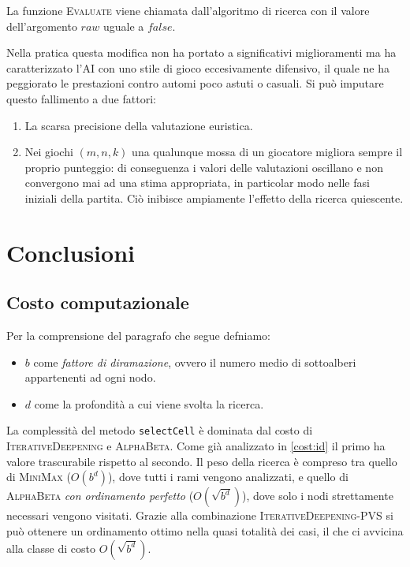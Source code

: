 \documentclass{article}
\begin{document}
La funzione \textsc{Evaluate} viene chiamata dall'algoritmo di ricerca con il valore
dell'argomento $raw$ uguale a $false$.

Nella pratica questa modifica non ha portato a significativi miglioramenti
ma ha caratterizzato l'AI con uno stile di gioco eccesivamente difensivo, il
quale ne ha peggiorato le prestazioni contro automi poco astuti o casuali.
Si pu\`o imputare questo fallimento a due fattori:
\begin{enumerate}
  \item La scarsa precisione della valutazione euristica.
  \item Nei giochi $(m, n, k)$ una qualunque mossa di un giocatore migliora sempre
    il proprio punteggio: di conseguenza i valori delle valutazioni oscillano e
    non convergono mai ad una stima appropriata, in particolar modo nelle fasi
    iniziali della partita. Ci\`o inibisce ampiamente l'effetto della ricerca
    quiescente.
\end{enumerate}

\section{Conclusioni}

\subsection{Costo computazionale}

Per la comprensione del paragrafo che segue defniamo:
\begin{itemize}
  \item $b$ come \emph{fattore di diramazione}, ovvero il numero medio di
    sottoalberi appartenenti ad ogni nodo.
  \item $d$ come la profondit\`a a cui viene svolta la ricerca.
\end{itemize}

La complessit\`a del metodo \verb!selectCell! \`e dominata dal costo di
\textsc{IterativeDeepening} e \textsc{AlphaBeta}. Come gi\`a analizzato in \ref{cost:id}
il primo ha valore trascurabile rispetto al secondo. Il peso della ricerca \`e
compreso tra quello di \textsc{MiniMax} ($O(b^d)$), dove tutti i rami vengono
analizzati, e quello di \textsc{AlphaBeta} \emph{con ordinamento perfetto}
($O(\sqrt{b^d})$), dove solo i nodi strettamente necessari vengono visitati.
Grazie alla combinazione \textsc{IterativeDeepening}-\textsc{PVS} si pu\`o
ottenere un ordinamento ottimo nella quasi totalit\`a dei casi, il che ci avvicina
alla classe di costo $O(\sqrt{b^d})$.
\end{document}
